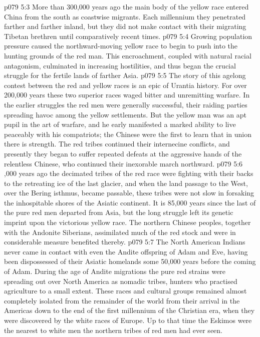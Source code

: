\vs p079 5:3 \pc More than 300,000 years ago the main body of the yellow race entered China from the south as coastwise migrants. Each millennium they penetrated farther and farther inland, but they did not make contact with their migrating Tibetan brethren until comparatively recent times.
\vs p079 5:4 Growing population pressure caused the northward\hyp{}moving yellow race to begin to push into the hunting grounds of the red man. This encroachment, coupled with natural racial antagonism, culminated in increasing hostilities, and thus began the crucial struggle for the fertile lands of farther Asia.
\vs p079 5:5 The story of this agelong contest between the red and yellow races is an epic of Urantia history. For over 200,000 years these two superior races waged bitter and unremitting warfare. In the earlier struggles the red men were generally successful, their raiding parties spreading havoc among the yellow settlements. But the yellow man was an apt pupil in the art of warfare, and he early manifested a marked ability to live peaceably with his compatriots; the Chinese were the first to learn that in union there is strength. The red tribes continued their internecine conflicts, and presently they began to suffer repeated defeats at the aggressive hands of the relentless Chinese, who continued their inexorable march northward.
\vs p079 5:6 ,000 years ago the decimated tribes of the red race were fighting with their backs to the retreating ice of the last glacier, and when the land passage to the West, over the Bering isthmus, became passable, these tribes were not slow in forsaking the inhospitable shores of the Asiatic continent. It is 85,000 years since the last of the pure red men departed from Asia, but the long struggle left its genetic imprint upon the victorious yellow race. The northern Chinese peoples, together with the Andonite Siberians, assimilated much of the red stock and were in considerable measure benefited thereby.
\vs p079 5:7 The North American Indians never came in contact with even the Andite offspring of Adam and Eve, having been dispossessed of their Asiatic homelands some 50,000 years before the coming of Adam. During the age of Andite migrations the pure red strains were spreading out over North America as nomadic tribes, hunters who practised agriculture to a small extent. These races and cultural groups remained almost completely isolated from the remainder of the world from their arrival in the Americas down to the end of the first millennium of the Christian era, when they were discovered by the white races of Europe. Up to that time the Eskimos were the nearest to white men the northern tribes of red men had ever seen.
